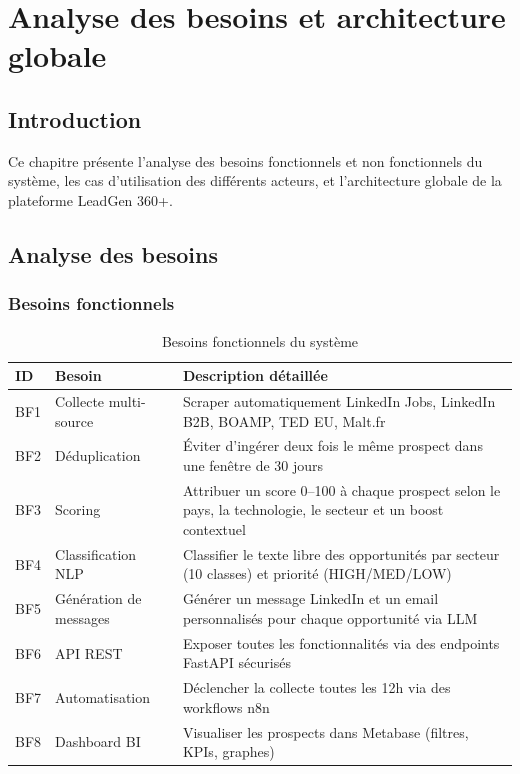 \chapter{Analyse des besoins et architecture globale}
\setcounter{chapter}{2}
\setcounter{section}{0}
\minitoc
\newpage

\section{Introduction}

Ce chapitre présente l'analyse des besoins fonctionnels et non fonctionnels du
système, les cas d'utilisation des différents acteurs, et l'architecture globale
de la plateforme LeadGen 360+.

\section{Analyse des besoins}

\subsection{Besoins fonctionnels}

\begin{table}[H]
  \centering
  \begin{tabular}{C{0.6cm} L{4.5cm} L{7.5cm}}
    \toprule
    \textbf{ID} & \textbf{Besoin} & \textbf{Description détaillée} \\
    \midrule
    BF1 & Collecte multi-source & Scraper automatiquement LinkedIn Jobs, LinkedIn B2B, BOAMP, TED EU, Malt.fr \\
    \addlinespace
    BF2 & Déduplication & Éviter d'ingérer deux fois le même prospect dans une fenêtre de 30 jours \\
    \addlinespace
    BF3 & Scoring & Attribuer un score 0--100 à chaque prospect selon le pays, la technologie, le secteur et un boost contextuel \\
    \addlinespace
    BF4 & Classification NLP & Classifier le texte libre des opportunités par secteur (10 classes) et priorité (HIGH/MED/LOW) \\
    \addlinespace
    BF5 & Génération de messages & Générer un message LinkedIn et un email personnalisés pour chaque opportunité via LLM \\
    \addlinespace
    BF6 & API REST & Exposer toutes les fonctionnalités via des endpoints FastAPI sécurisés \\
    \addlinespace
    BF7 & Automatisation & Déclencher la collecte toutes les 12h via des workflows n8n \\
    \addlinespace
    BF8 & Dashboard BI & Visualiser les prospects dans Metabase (filtres, KPIs, graphes) \\
    \bottomrule
  \end{tabular}
  \caption{Besoins fonctionnels du système}
  \label{tab:bf}
\end{table}

